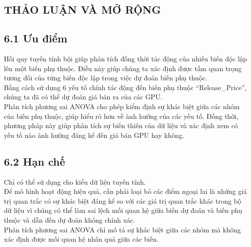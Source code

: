\documentclass[a4paper]{article}
\newcommand{\gachdau}{\hspace*{1.5em}\ignorespaces}
\begin{document}
\newpage
    \begin{center}
        \section*{THẢO LUẬN VÀ MỞ RỘNG}
    \end{center}
        \vspace{-1pt}
        \subsection*{6.1 Ưu điểm}
            \vspace{-4pt}
            \gachdau
            Hồi quy tuyến tính bội giúp phân tích đồng thời tác động của nhiều biến độc lập lên một biến phụ thuộc. Điều này giúp chúng ta xác định được tầm quan trọng tương đối của từng biến độc lập trong việc dự đoán biến phụ thuộc.\\
            \gachdau
            Bằng cách sử dụng 6 yếu tố chính tác động đến biến phụ thuộc “Release\_Price”, chúng ta đã có thể dự đoán giá bán ra của các GPU.\\
            \gachdau
            Phân tích phương sai ANOVA cho phép kiểm định sự khác biệt giữa các nhóm của biến phụ thuộc, giúp hiểu rõ hơn về ảnh hưởng của các yếu tố. Đồng thời, phương pháp này giúp phân tích sự biến thiên của dữ liệu và xác định xem có yếu tố nào ảnh hưởng đáng kể đến giá bán GPU hay không.

        \vspace{-7pt}
        \subsection*{6.2 Hạn chế}
            \vspace{-4pt}
            \gachdau
            Chỉ có thể sử dụng cho kiểu dữ liệu tuyến tính.\\
            \gachdau
            Để mô hình hoạt động hiệu quả, cần phải loại bỏ các điểm ngoại lai là những giá trị quan trắc có sự khác biệt đáng kể so với các giá trị quan trắc khác trong bộ dữ liệu vì chúng có thể làm sai lệch mối quan hệ giữa biến dự đoán và biến phụ thuộc và dẫn đến dự đoán không chính xác.\\
            \gachdau
            Phân tích phương sai ANOVA chỉ mô tả sự khác biệt giữa các nhóm mà không xác định được mối quan hệ nhân quả giữa các biến.
\end{document}
